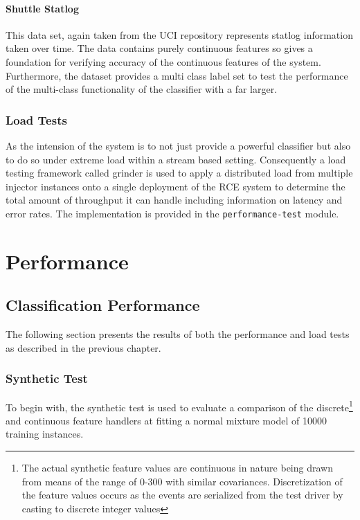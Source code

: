 \documentclass[a4paper,11pt]{scrreprt}
\begin{document}
\subsubsection{Shuttle Statlog}
This data set, again taken from the UCI repository represents statlog information taken over time. The data contains purely continuous features so gives a foundation for verifying accuracy of the continuous features of the system. Furthermore, the dataset provides a multi class label set to test the performance of the multi-class functionality of the classifier with a far larger. 

\subsection{Load Tests}
As the intension of the system is to not just provide a powerful classifier but also to do so under extreme load within a stream based setting. Consequently a load testing framework called grinder\cite{grinder} is used to apply a distributed load from multiple injector instances onto a single deployment of the RCE system to determine the total amount of throughput it can handle including information on latency and error rates. The implementation is provided in the \verb|performance-test| module.

\chapter{Performance}
\section{Classification Performance}
The following section presents the results of both the performance and load tests as described in the previous chapter.
\clearpage
\subsection{Synthetic Test}
To begin with, the synthetic test is used to evaluate a comparison of the discrete\footnote{The actual synthetic feature values are continuous in nature being drawn from means of the range of 0-300 with similar covariances. Discretization of the feature values occurs as the events are serialized from the test driver by casting to discrete integer values } and continuous feature handlers at fitting a normal mixture model of 10000 training instances.
\end{document}
